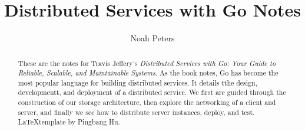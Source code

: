 \documentclass[a4paper]{report}
\author{Noah Peters}
\title{Distributed Services with Go Notes}
\begin{document}
\maketitle

\begin{abstract}
	These are the notes for Travis Jeffery's \emph{Distributed Services with Go: Your Guide to Reliable, Scalable, and Maintainable Systems}. As the book notes, Go has become the most popular language for building distributed services. It details tthe design, developmentt, and deployment of a distributed service. We first are guided through the construction of our storage architecture, then explore the networking of a client and server, and finally we see how to distribute server instances, deploy, and test. \\ \LaTeX template by Pingbang Hu.
\end{abstract}

\newpage

\tableofcontents


\newpage
\appendix
\appendixpage



\newpage
\printbibliography
\end{document}
